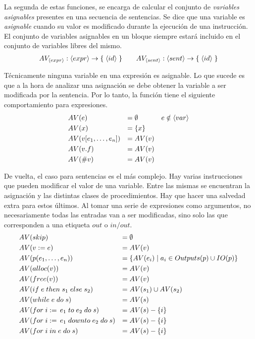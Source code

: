 \documentclass{article}
\begin{document}
La segunda de estas funciones, se encarga de calcular el conjunto de \textit{variables asignables} presentes en una secuencia de sentencias.
Se dice que una variable es \textit{asignable} cuando su valor es modificado durante la ejecución de una instrucción.
El conjunto de variables asignables en un bloque siempre estará incluido en el conjunto de variables libres del mismo.
\begin{gather*}
AV_{\langle expr \rangle}: \langle expr \rangle \rightarrow \{ \; \langle id \rangle \; \}
\qquad
AV_{\langle sent \rangle}: \langle sent \rangle \rightarrow \{ \; \langle id \rangle \; \}
\end{gather*}

Técnicamente ninguna variable en una expresión es asignable.
Lo que sucede es que a la hora de analizar una asignación se debe obtener la variable a ser modificada por la sentencia.
Por lo tanto, la función tiene el siguiente comportamiento para expresiones.
\begin{align*}
&AV(e)
&=&\;
\emptyset
&e \notin \langle var \rangle
\\
&AV(x)
&=&\;
\{ x \}
\\
&AV(v [e_1, \ldots, e_n])
&=&\;
AV(v)
\\
&AV(v.f)
&=&\;
AV(v)
\\
&AV(\# v)
&=&\;
AV(v)
\end{align*}

De vuelta, el caso para sentencias es el más complejo.
Hay varias instrucciones que pueden modificar el valor de una variable.
Entre las mismas se encuentran la asignación y las distintas clases de procedimientos.
Hay que hacer una salvedad extra para estos últimos.
Al tomar una serie de expresiones como argumentos, no necesariamente todas las entradas van a ser modificadas, sino solo las que corresponden a una etiqueta $out$ o $in/out$.
\begin{align*}
&AV(skip)
&=&\;
\emptyset
\\
&AV(v := e)
&=&\;
AV(v)
\\
&AV(p(e_1, \ldots, e_n))
&=&\;
\{ AV(e_i) \mid a_i \in Outputs(p) \cup IO(p) \}
\\
&AV(alloc(v))
&=&\;
AV(v)
\\
&AV(free(v))
&=&\;
AV(v)
\\
&AV(if \; e \; then \; s_1 \; else \; s_2)
&=&\;
AV(s_1) \cup AV(s_2)
\\
&AV(while \; e \; do \; s)
&=&\;
AV(s)
\\
&AV(for \; i := \, e_1 \; to \; e_2 \; do \; s)
&=&\;
AV(s) - \{ i \}
\\
&AV(for \; i := \, e_1 \; downto \; e_2 \; do \; s)
&=&\;
AV(s) - \{ i \}
\\
&AV(for \; i \; in \; e \; do \; s)
&=&\;
AV(s) - \{ i \}
\end{align*}
\end{document}
